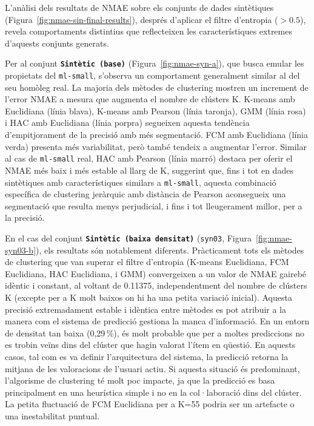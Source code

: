 \documentclass[a4paper,12pt]{report}
\begin{document}
L'anàlisi dels resultats de NMAE sobre els conjunts de dades sintètiques (Figura~\ref{fig:nmae-sin-final-results}), després d'aplicar el filtre d'entropia ($> 0.5$), revela comportaments distintius que reflecteixen les característiques extremes d'aquests conjunts generats.

Per al conjunt \textbf{\texttt{Sintètic (base)}} (Figura~\ref{fig:nmae-syn-a}), que busca emular les propietats del \texttt{ml-small}, s'observa un comportament generalment similar al del seu homòleg real. La majoria dels mètodes de clustering mostren un increment de l'error NMAE a mesura que augmenta el nombre de clústers K. K-means amb Euclidiana (línia blava), K-means amb Pearson (línia taronja), GMM (línia rosa) i HAC amb Euclidiana (línia porpra) segueixen aquesta tendència d'empitjorament de la precisió amb més segmentació. FCM amb Euclidiana (línia verda) presenta més variabilitat, però també tendeix a augmentar l'error. Similar al cas de \texttt{ml-small} real, HAC amb Pearson (línia marró) destaca per oferir el NMAE més baix i més estable al llarg de K, suggerint que, fins i tot en dades sintètiques amb característiques similars a \texttt{ml-small}, aquesta combinació específica de clustering jeràrquic amb distància de Pearson aconsegueix una segmentació que resulta menys perjudicial, i fins i tot lleugerament millor, per a la precisió.

En el cas del conjunt \textbf{\texttt{Sintètic (baixa densitat)}} (\texttt{syn03}, Figura~\ref{fig:nmae-syn03-b}), els resultats són notablement diferents. Pràcticament tots els mètodes de clustering que van superar el filtre d'entropia (K-means Euclidiana, FCM Euclidiana, HAC Euclidiana, i GMM) convergeixen a un valor de NMAE gairebé idèntic i constant, al voltant de 0.11375, independentment del nombre de clústers K (excepte per a K molt baixos on hi ha una petita variació inicial). Aquesta precisió extremadament estable i idèntica entre mètodes es pot atribuir a la manera com el sistema de predicció gestiona la manca d'informació. En un entorn de densitat tan baixa (0,29\,\%), és molt probable que per a moltes prediccions no es trobin veïns dins del clúster que hagin valorat l'ítem en qüestió. En aquests casos, tal com es va definir l'arquitectura del sistema, la predicció retorna la mitjana de les valoracions de l'usuari actiu. Si aquesta situació és predominant, l'algorisme de clustering té molt poc impacte, ja que la predicció es basa principalment en una heurística simple i no en la col·laboració dins del clúster. La petita fluctuació de FCM Euclidiana per a K=55 podria ser un artefacte o una inestabilitat puntual.
\end{document}
